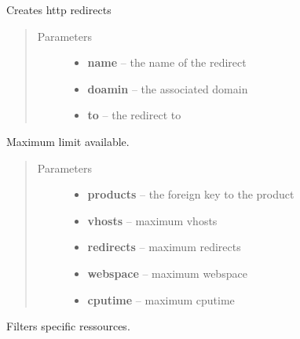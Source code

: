\documentclass[letterpaper,10pt,english]{sphinxmanual}
\begin{document}

\begin{fulllineitems}
\label{api/web:limeade.web.models.HTTPRedirect}
Creates http redirects
\begin{quote}\begin{description}
\item[{Parameters}] \leavevmode\begin{itemize}
\item {} 
\textbf{name} -- the name of the redirect

\item {} 
\textbf{doamin} -- the associated domain

\item {} 
\textbf{to} -- the redirect to

\end{itemize}

\end{description}\end{quote}

\end{fulllineitems}


\begin{fulllineitems}
\label{api/web:limeade.web.models.Limitset}
Maximum limit available.
\begin{quote}\begin{description}
\item[{Parameters}] \leavevmode\begin{itemize}
\item {} 
\textbf{products} -- the foreign key to the product

\item {} 
\textbf{vhosts} -- maximum vhosts

\item {} 
\textbf{redirects} -- maximum redirects

\item {} 
\textbf{webspace} -- maximum webspace

\item {} 
\textbf{cputime} -- maximum cputime

\end{itemize}

\end{description}\end{quote}

\begin{fulllineitems}
\label{api/web:limeade.web.models.Limitset.utilization}
Filters specific ressources.

\end{fulllineitems}


\end{fulllineitems}
\end{document}
